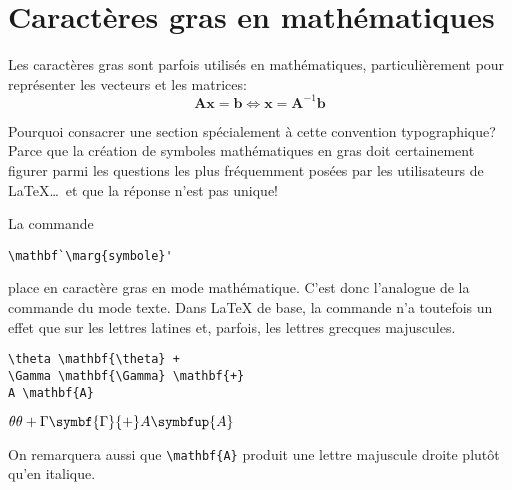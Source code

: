 



\section{Caractères gras en mathématiques}
\label{sec:math:gras}

Les caractères gras sont parfois utilisés en mathématiques,
particulièrement pour représenter les vecteurs et les matrices:
\begin{equation*}
  \symbf{A} \symbf{x} = \symbf{b} \Leftrightarrow
  \symbf{x} = \symbf{A}^{-1} \symbf{b}
\end{equation*}

Pourquoi consacrer une section spécialement à cette convention
typographique? Parce que la création de symboles mathématiques en
gras doit certainement figurer parmi les questions les plus
fréquemment posées par les utilisateurs de {\LaTeX}\dots\ et que la
réponse n'est pas unique!

La commande
\begin{lstlisting}
\mathbf`\marg{symbole}'
\end{lstlisting}
place  en caractère gras en mode mathématique. C'est
donc l'analogue de la commande \cmd{\textbf} du mode texte. Dans
{\LaTeX} de base, la commande n'a toutefois un effet que sur les
lettres latines et, parfois, les lettres grecques majuscules.
\begin{demo}
  \begin{texample}[0.6\linewidth]
\begin{lstlisting}
\theta \mathbf{\theta} +
\Gamma \mathbf{\Gamma} \mathbf{+}
A \mathbf{A}
\end{lstlisting}
    \producing
    $\theta {\theta} + \Gamma \symbf{\Gamma} {+} A \symbfup{A}$
  \end{texample}
\end{demo}
On remarquera aussi que \verb=\mathbf{A}= produit une lettre
majuscule droite plutôt qu'en italique.

